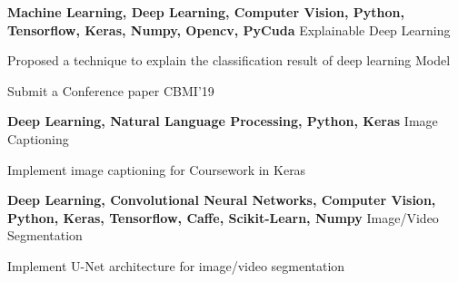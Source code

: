 

\begin{cventries}

  \cventry
    {\textbf{Machine Learning, Deep Learning, Computer Vision, Python,
Tensorflow, Keras, Numpy, Opencv, PyCuda}} %
    {Explainable Deep Learning} %
    {} %
    {} %
    {
      \begin{cvitems} %
        \item {Proposed a technique to explain the classification result of deep learning Model}
        \item {Submit a Conference paper CBMI'19}
      \end{cvitems}
    }
  \cventry
    {\textbf{Deep Learning, Natural Language Processing, Python, Keras}} %
    {Image Captioning} %
    {} %
    {} %
    {
      \begin{cvitems} %
        \item {Implement image captioning for Coursework in Keras}
      \end{cvitems}
    }
  \cventry
    {\textbf{Deep Learning, Convolutional Neural Networks, Computer
Vision, Python, Keras, Tensorflow, Caffe, Scikit-Learn, Numpy}}
    {Image/Video Segmentation} %
    {} %
    {} %
    {
      \begin{cvitems} %
        \item {Implement U-Net architecture for image/video segmentation}
      \end{cvitems}
    }


\end{cventries}
